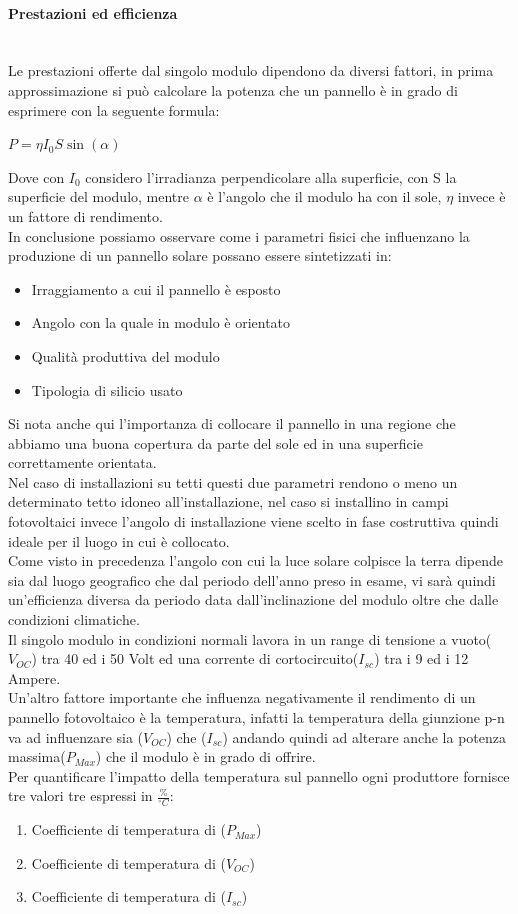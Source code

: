 \paragraph{Prestazioni ed efficienza}\mbox{}\\
Le prestazioni offerte dal singolo modulo dipendono da diversi fattori, in prima approssimazione si può calcolare la potenza che un pannello è in grado di esprimere con la seguente formula:
\begin{center}
    \large{$P = \eta I_0 S \sin(\alpha)  $}
\end{center}
Dove con $I_0$ considero l'irradianza perpendicolare alla superficie, con S la superficie del modulo, mentre $\alpha$ è l'angolo che il modulo ha con il sole, $\eta$ invece è un fattore di rendimento.\\
In conclusione possiamo osservare come i parametri fisici che influenzano la produzione di un pannello solare possano essere sintetizzati in:
\begin{itemize}
    \item Irraggiamento a cui il pannello è esposto
    \item Angolo con la quale in modulo è orientato
    \item Qualità produttiva del modulo
    \item Tipologia di silicio usato
\end{itemize}
Si nota anche qui l'importanza di collocare il pannello in una regione che abbiamo una buona copertura da parte del sole ed in una superficie correttamente orientata.\\
Nel caso di installazioni su tetti questi due parametri rendono o meno un determinato tetto idoneo all'installazione, nel caso si installino in campi fotovoltaici invece l'angolo di installazione
viene scelto in fase costruttiva quindi ideale per il luogo in cui è collocato.\\
Come visto in precedenza l'angolo con cui la luce solare colpisce la terra dipende sia dal luogo geografico che dal periodo dell'anno preso in esame,
vi sarà quindi un'efficienza diversa da periodo data dall'inclinazione del modulo oltre che dalle condizioni climatiche.\\
Il singolo modulo in condizioni normali lavora in un range di tensione a vuoto($V_{OC}$) tra 40 ed i 50 Volt ed una corrente di cortocircuito($I_{sc}$) tra i 9 ed i 12 Ampere.\\
Un'altro fattore importante che influenza negativamente il rendimento di un pannello fotovoltaico è la temperatura,
infatti la temperatura della giunzione p-n va ad influenzare sia ($V_{OC}$) che ($I_{sc}$) andando quindi ad alterare anche la potenza massima($P_{Max}$) che il modulo è in grado di offrire.\\
Per quantificare l'impatto della temperatura sul pannello ogni produttore fornisce tre valori tre espressi in $\frac{\%}{^\circ C}$:
\begin{enumerate}
    \item Coefficiente di temperatura di ($P_{Max}$)
    \item Coefficiente di temperatura di ($V_{OC}$)
    \item Coefficiente di temperatura di ($I_{sc}$)
\end{enumerate}
\newpage
